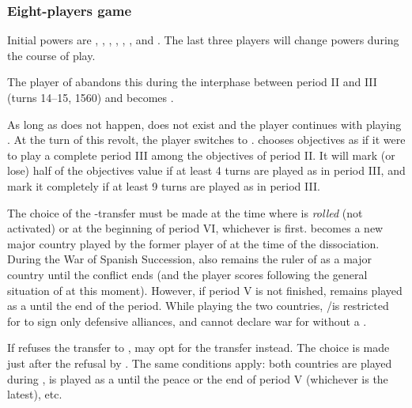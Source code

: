 \subsubsection{Eight-players game}
\aparag Initial powers are \TUR, \HIS, \FRA, \ANG, \RUS, \VEN, \POR and
\POL. The last three players will change powers during the course of play.

 \label{chSpecific:Campaign:Transfer Portugal} The
player of \paysmajeurPortugal abandons this \MAJ during the interphase between
period II and III (turns 14--15, 1560) and becomes \paysmajeurSuede.

\aparag[\paysmajeurVenise-\paysmajeurVenise] \label{chSpecific:Campaign:Transfer
  Venice} As long as  does not happen,
\paysmajeurHollande does not exist and the player continues with playing
\paysmajeurVenise.  At the turn of this revolt, the player switches to
\paysmajeurHollande.
\bparag \paysmajeurVenise chooses objectives as if it were to play a complete
period III among the objectives of period II. It will mark (or lose) half of
the objectives value if at least 4 turns are played as \VEN in period III, and
mark it completely if at least 9 turns are played as \VEN in period III.

\aparag[\paysmajeurHollande-\paysmajeurAutriche] \label{chSpecific:Campaign:Transfer
  Holland} The choice of the \HOL-\AUS transfer must be made at the time where
 is \emph{rolled} (not activated) or at the beginning of
period VI, whichever is first.
\bparag \paysmajeurAutriche becomes a new major country played by the former
player of \paysmajeurHollande at the time of the dissociation.
\bparag During the War of Spanish Succession, \AUS also remains the ruler of
\paysmajeurHollande as a major country until the conflict ends (and the player
scores \VP following the general situation of \paysmajeurHollande at this
moment).
\bparag However, if period V is not finished, \paysmajeurHollande remains
played as a \MAJ until the end of the period. While playing the two countries,
\HOL/\AUS is restricted for \HOL to sign only defensive alliances, and cannot
declare war for \HOL without a \CB.

 \label{chSpecific:Campaign:Transfer Sweden} If \HOL
refuses the transfer to \AUS, \SUE may opt for the transfer instead. The
choice is made just after the refusal by \HOL.  The same conditions apply:
both countries are played during , \SUE is played as a \MAJ
until the peace or the end of period V (whichever is the latest), etc.

